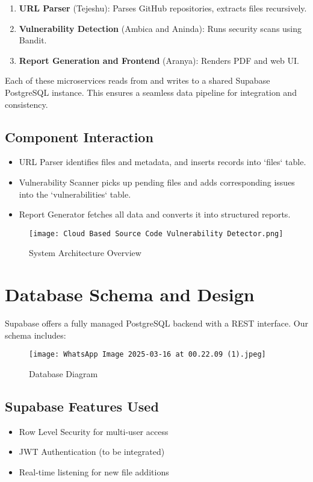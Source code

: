 \documentclass{article}
\begin{document}
\begin{enumerate}
    \item \textbf{URL Parser} (Tejeshu): Parses GitHub repositories, extracts files recursively.
    \item \textbf{Vulnerability Detection} (Ambica and Aninda): Runs security scans using Bandit.
    \item \textbf{Report Generation and Frontend} (Aranya): Renders PDF and web UI.
\end{enumerate}

Each of these microservices reads from and writes to a shared Supabase PostgreSQL instance. This ensures a seamless data pipeline for integration and consistency.

\subsection{Component Interaction}
\begin{itemize}
    \item URL Parser identifies files and metadata, and inserts records into `files` table.
    \item Vulnerability Scanner picks up pending files and adds corresponding issues into the `vulnerabilities` table.
    \item Report Generator fetches all data and converts it into structured reports.
\end{itemize}

\begin{figure}[h!]
\centering
\texttt{[image: Cloud Based Source Code Vulnerability Detector.png]}
\caption{System Architecture Overview}
\end{figure}

\section{Database Schema and Design}
Supabase offers a fully managed PostgreSQL backend with a REST interface. Our schema includes:
\begin{figure}[h!]
\centering
\texttt{[image: WhatsApp Image 2025-03-16 at 00.22.09 (1).jpeg]}
\caption{Database Diagram}
\end{figure}


\subsection{Supabase Features Used}
\begin{itemize}
    \item Row Level Security for multi-user access
    \item JWT Authentication (to be integrated)
    \item Real-time listening for new file additions
\end{itemize}
\end{document}
